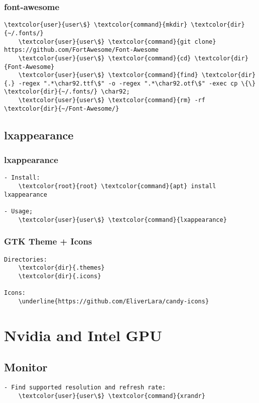 \documentclass[10pt, a4paper, onecolumn, openany]{book} %
\begin{document}
\subsection{font-awesome}
\begin{Verbatim}[commandchars=\\\{\}]
    \textcolor{user}{user\$} \textcolor{command}{mkdir} \textcolor{dir}{~/.fonts/}
    \textcolor{user}{user\$} \textcolor{command}{git clone} https://github.com/FortAwesome/Font-Awesome
    \textcolor{user}{user\$} \textcolor{command}{cd} \textcolor{dir}{Font-Awesome}
    \textcolor{user}{user\$} \textcolor{command}{find} \textcolor{dir}{.} -regex ".*\char92.ttf\$" -o -regex ".*\char92.otf\$" -exec cp \{\} \textcolor{dir}{~/.fonts/} \char92;
    \textcolor{user}{user\$} \textcolor{command}{rm} -rf \textcolor{dir}{~/Font-Awesome/}
\end{Verbatim}

\section{lxappearance}
\subsection{lxappearance}
\begin{Verbatim}[commandchars=\\\{\}]
- Install:
    \textcolor{root}{root} \textcolor{command}{apt} install lxappearance
    
- Usage;
    \textcolor{user}{user\$} \textcolor{command}{lxappearance}
\end{Verbatim}
\subsection{GTK Theme + Icons}
\begin{Verbatim}[commandchars=\\\{\}]
Directories:
    \textcolor{dir}{.themes}
    \textcolor{dir}{.icons}
    
Icons:
    \underline{https://github.com/EliverLara/candy-icons}
\end{Verbatim}




\chapter{Nvidia and Intel GPU}
\section{Monitor}
\begin{Verbatim}[commandchars=\\\{\}]
- Find supported resolution and refresh rate:
    \textcolor{user}{user\$} \textcolor{command}{xrandr}
\end{Verbatim}
\end{document}
